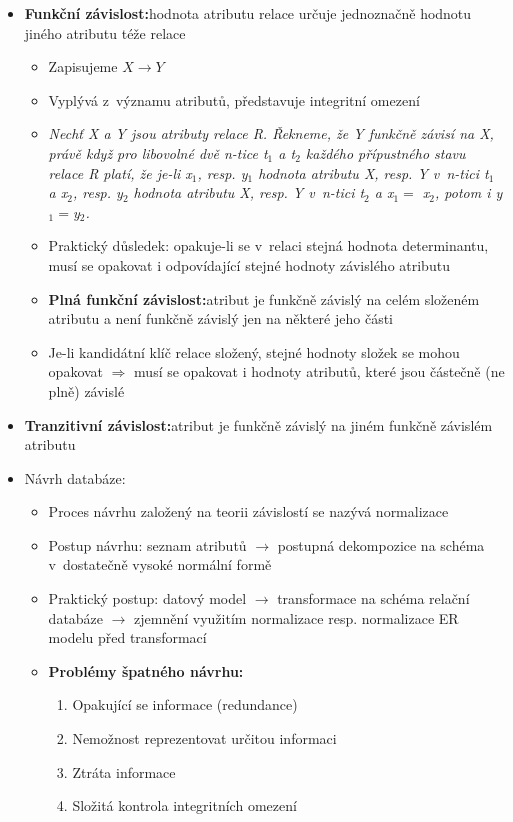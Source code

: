 \documentclass[a4paper,10pt]{article}
\newcommand{\pojem}[2]{\item \textbf{#1:}\quad #2}
\newcommand{\tedy}{$\Rightarrow$ }
\begin{document}
			\begin{itemize}
				\pojem{Funkční závislost}{hodnota atributu relace určuje jednoznačně hodnotu jiného atributu téže relace}
				\begin{itemize}
					\item Zapisujeme $X \rightarrow Y$
					\item Vyplývá z~významu atributů, představuje integritní omezení
					\item \emph{Nechť X a Y jsou atributy relace R. Řekneme, že Y funkčně závisí na X, právě když pro libovolné dvě n-tice t$_1$ a t$_2$ každého přípustného stavu relace R platí, že je-li x$_1$, resp. y$_1$ hodnota atributu X, resp. Y v~n-tici t$_1$ a x$_2$, resp. y$_2$ hodnota atributu X, resp. Y v~n-tici t$_2$ a x$_1 = $ x$_2$, potom i y$_1 = $y$_2$.}
					\item Praktický důsledek: opakuje-li se v~relaci stejná hodnota determinantu, musí se opakovat i odpovídající stejné hodnoty závislého atributu

					\pojem{Plná funkční závislost}{atribut je funkčně závislý na celém složeném atributu a není funkčně závislý jen na některé jeho části}
					\item Je-li kandidátní klíč relace složený, stejné hodnoty složek se mohou opakovat \tedy musí se opakovat i hodnoty atributů, které jsou částečně (ne plně) závislé
				\end{itemize}
				\pojem{Tranzitivní závislost}{atribut je funkčně závislý na jiném funkčně závislém atributu}

				\item Návrh databáze:
				\begin{itemize}
					\item Proces návrhu založený na teorii závislostí se nazývá normalizace
					\item Postup návrhu: seznam atributů $\rightarrow$ postupná dekompozice na schéma v~dostatečně vysoké normální formě
					\item Praktický postup: datový model $\rightarrow$ transformace na schéma relační databáze $\rightarrow$ zjemnění využitím normalizace resp. normalizace ER modelu před transformací
					\pojem{Problémy špatného návrhu}
					\begin{enumerate}
						\item Opakující se informace (redundance)
						\item Nemožnost reprezentovat určitou informaci
						\item Ztráta informace
						\item Složitá kontrola integritních omezení
					\end{enumerate}
				\end{itemize}	
			\end{itemize}
\end{document}

